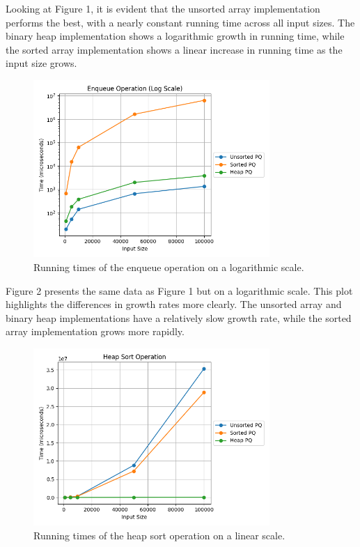 \documentclass{article}
\begin{document}
Looking at Figure 1, it is evident that the unsorted array implementation performs the best, with a nearly constant running time across all input sizes. 
The binary heap implementation shows a logarithmic growth in running time, while the sorted array implementation shows a linear increase in running time as the input size grows.

\begin{figure}[H]
    \centering
    \includegraphics[width=0.8\textwidth]{../plots/enqueue_log.png}
    \caption{Running times of the enqueue operation on a logarithmic scale.}
\end{figure}

Figure 2 presents the same data as Figure 1 but on a logarithmic scale. 
This plot highlights the differences in growth rates more clearly. 
The unsorted array and binary heap implementations have a relatively slow growth rate, while the sorted array implementation grows more rapidly.

\begin{figure}[H]
    \centering
    \includegraphics[width=0.8\textwidth]{../plots/heapsort_linear.png}
    \caption{Running times of the heap sort operation on a linear scale.}
\end{figure}
\end{document}
